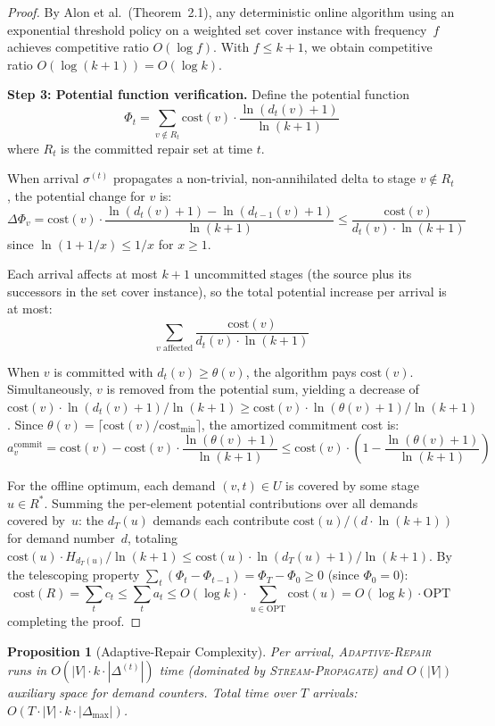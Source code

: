 \documentclass[11pt,a4paper]{article}
\newtheorem{proposition}[theorem]{Proposition}
\theoremstyle{definition}
\newcommand{\cost}{\mathrm{cost}}
\newcommand{\OPT}{\mathrm{OPT}}
\begin{document}
\begin{proof}
By Alon et al.\ (Theorem~2.1), any deterministic online algorithm using an
exponential threshold policy on a weighted set cover instance with
frequency~$f$ achieves competitive ratio $O(\log f)$.  With $f \leq k + 1$,
we obtain competitive ratio $O(\log(k+1)) = O(\log k)$.

\textbf{Step 3: Potential function verification.}
Define the potential function
\[
  \Phi_t = \sum_{v \notin R_t} \cost(v) \cdot
    \frac{\ln(d_t(v) + 1)}{\ln(k + 1)}
\]
where $R_t$ is the committed repair set at time $t$.

When arrival $\sigma^{(t)}$ propagates a non-trivial, non-annihilated delta
to stage $v \notin R_t$, the potential change for $v$ is:
\[
  \Delta\Phi_v = \cost(v) \cdot
    \frac{\ln(d_t(v) + 1) - \ln(d_{t-1}(v) + 1)}{\ln(k+1)}
    \leq \frac{\cost(v)}{d_t(v) \cdot \ln(k+1)}
\]
since $\ln(1 + 1/x) \leq 1/x$ for $x \geq 1$.

Each arrival affects at most $k+1$ uncommitted stages (the source plus its
successors in the set cover instance), so the total potential increase per
arrival is at most:
\[
  \sum_{v \text{ affected}} \frac{\cost(v)}{d_t(v) \cdot \ln(k+1)}
\]

When $v$ is committed with $d_t(v) \geq \theta(v)$, the algorithm pays
$\cost(v)$.  Simultaneously, $v$ is removed from the potential sum, yielding
a decrease of $\cost(v) \cdot \ln(d_t(v)+1)/\ln(k+1) \geq \cost(v) \cdot
\ln(\theta(v)+1)/\ln(k+1)$.  Since
$\theta(v) = \lceil\cost(v)/\cost_{\min}\rceil$, the amortized commitment
cost is:
\[
  a_v^{\mathrm{commit}} = \cost(v) - \cost(v) \cdot
  \frac{\ln(\theta(v)+1)}{\ln(k+1)}
  \leq \cost(v) \cdot \left(1 - \frac{\ln(\theta(v)+1)}{\ln(k+1)}\right)
\]

For the offline optimum, each demand $(v,t) \in U$ is covered by some stage
$u \in R^*$.  Summing the per-element potential contributions over all demands
covered by~$u$: the $d_T(u)$ demands each contribute
$\cost(u)/(d \cdot \ln(k+1))$ for demand number~$d$, totaling
$\cost(u) \cdot H_{d_T(u)}/\ln(k+1) \leq \cost(u) \cdot \ln(d_T(u)+1)
/\ln(k+1)$.  By the telescoping property
$\sum_t(\Phi_t - \Phi_{t-1}) = \Phi_T - \Phi_0 \geq 0$ (since
$\Phi_0 = 0$):
\[
  \cost(R) = \sum_t c_t \leq \sum_t a_t
    \leq O(\log k) \cdot \sum_{u \in \OPT} \cost(u)
    = O(\log k) \cdot \OPT
\]
completing the proof.
\end{proof}

\begin{proposition}[Adaptive-Repair Complexity]\label{prop:adaptive-complexity}
Per arrival, \textsc{Adaptive-Repair} runs in
$O(|V| \cdot k \cdot |\Delta^{(t)}|)$ time (dominated by
\textsc{Stream-Propagate}) and $O(|V|)$ auxiliary space for demand counters.
Total time over $T$ arrivals: $O(T \cdot |V| \cdot k \cdot |\Delta_{\max}|)$.
\end{proposition}
\end{document}
